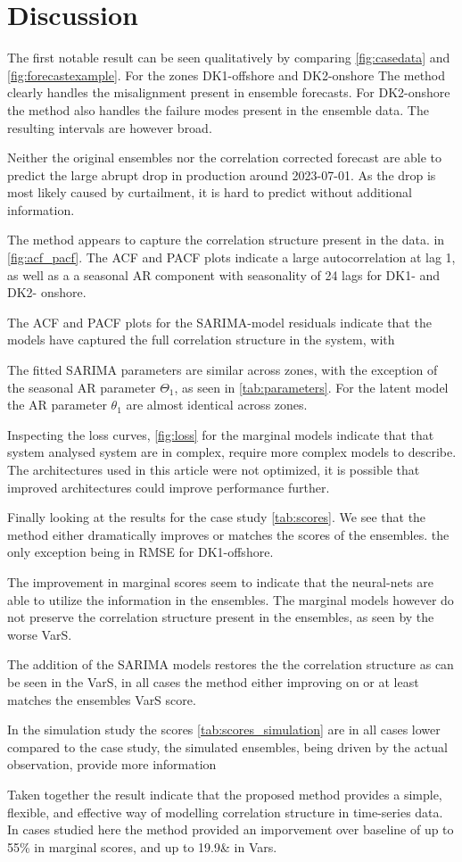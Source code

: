 \section{Discussion}

The first notable result can be seen qualitatively by comparing \cref{fig:casedata} and \cref{fig:forecastexample}. For the zones DK1-offshore and DK2-onshore The method clearly handles the misalignment present in ensemble forecasts.
For DK2-onshore the method also handles the failure modes present in the ensemble data. The resulting intervals are however broad.

Neither the original ensembles nor the correlation corrected forecast are able to predict the large abrupt drop in production around 2023-07-01. As the drop is most likely caused by curtailment, it is hard to predict without additional information. 

The method appears to capture the correlation structure present in the data. in \cref{fig:acf_pacf}. The ACF and PACF plots indicate a large autocorrelation at lag 1, as well as a a seasonal AR component with seasonality of 24 lags for DK1- and DK2- onshore.

The  ACF and PACF plots for the SARIMA-model residuals indicate that the models have captured the full correlation structure in the system, with 

The fitted SARIMA parameters are similar across zones, with the exception of the seasonal AR parameter $\Theta_1$, as seen in \cref{tab:parameters}. For the latent model the AR parameter $\theta_1$ are almost identical across zones.

Inspecting the loss curves, \cref{fig:loss} for the marginal models indicate that that system analysed system are in complex, require more complex models to describe. The architectures used in this article were not optimized, it is possible that improved architectures could improve performance further.

Finally looking at the results for the case study \cref{tab:scores}.  We see that the method either dramatically improves or matches the scores of the ensembles. the only exception being in RMSE for DK1-offshore.

The improvement in marginal scores seem to indicate that the neural-nets are able to utilize the information in the ensembles. The marginal models however do not preserve the correlation structure present in the ensembles, as seen by the worse VarS.

The addition of the SARIMA models restores the the correlation structure as can be seen in the VarS, in all cases the method either improving on or at least matches the ensembles VarS score.

In the simulation study the scores \cref{tab:scores_simulation} are in all cases lower compared to the case study, the simulated ensembles, being driven by the actual observation, provide more information 

Taken together the result indicate that the proposed method provides a simple, flexible, and effective way of modelling correlation structure in time-series data. In cases studied here the method provided an imporvement over baseline of up to 55\% in marginal scores, and up to 19.9\& in Vars.